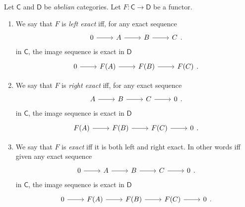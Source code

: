 \documentclass[../Main]{subfiles}
\begin{document}
\begin{defn}[]
	Let $\mathsf{C}$ and $\mathsf{D}$ be {\em abelian} categories.
	Let $F\colon \mathsf{C} \to \mathsf{D}$ be a functor.
	\begin{enumerate}
		\item 
	We say that $F$ is {\em left exact} iff, for any exact sequence
	\begin{equation}
	\begin{tikzcd}
		0 \arrow[r, "", rightarrow] &
		A \arrow[r, "", rightarrow] &
		B \arrow[r, "", rightarrow] &
		C
	\end{tikzcd}
	.\end{equation} 
	in $\mathsf{C}$, the image sequence is exact in $\mathsf{D}$
	\begin{equation}
	\begin{tikzcd}
		0 \arrow[r, "", rightarrow] &
		F(A) \arrow[r, "", rightarrow] &
		F(B) \arrow[r, "", rightarrow] &
		F(C)
	\end{tikzcd}
	.\end{equation} 
		\item 
	We say that $F$ is {\em right exact} iff, for any exact sequence
	\begin{equation}
	\begin{tikzcd}
		A \arrow[r, "", rightarrow] &
		B \arrow[r, "", rightarrow] &
		C \arrow[r, "", rightarrow] &
		0
	\end{tikzcd}
	.\end{equation} 
	in $\mathsf{C}$, the image sequence is exact in $\mathsf{D}$
	\begin{equation}
	\begin{tikzcd}
		F(A) \arrow[r, "", rightarrow] &
		F(B) \arrow[r, "", rightarrow] &
		F(C) \arrow[r, "", rightarrow] &
		0
	\end{tikzcd}
	.\end{equation} 
\item We say that $F$ is {\em exact} iff it is both left and right exact.
	In other words iff given any exact sequence
	\begin{equation}
	\begin{tikzcd}
		0 \arrow[r, "", rightarrow] &
		A \arrow[r, "", rightarrow] &
		B \arrow[r, "", rightarrow] &
		C \arrow[r, "", rightarrow] &
		0
	\end{tikzcd}
	.\end{equation} 
	in $\mathsf{C}$, the image sequence is exact in $\mathsf{D}$
	\begin{equation}
	\begin{tikzcd}
		0 \arrow[r, "", rightarrow] &
		F(A) \arrow[r, "", rightarrow] &
		F(B) \arrow[r, "", rightarrow] &
		F(C) \arrow[r, "", rightarrow] &
		0
	\end{tikzcd}
	.\end{equation} 
	\end{enumerate}
\end{defn}
\end{document}
